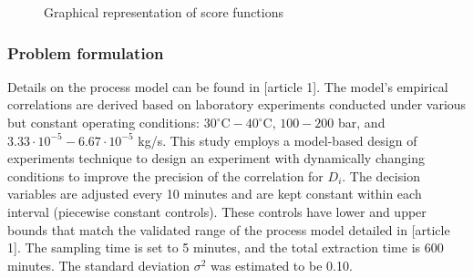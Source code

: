 \documentclass[../Article_Design_of_Experiment.tex]{subfiles}
\begin{document}
	\begin{figure}[!h]
		\centering
		\caption{Graphical representation of score functions}
		\label{fig:score_fun}
	\end{figure}
	
	\subsubsection{Problem formulation}
	
	Details on the process model can be found in [article 1]. The model's empirical correlations are derived based on laboratory experiments conducted under various but constant operating conditions: $30^\circ\text{C} - 40^\circ\text{C}$, $100 - 200$ bar, and $3.33 \cdot 10^{-5} - 6.67 \cdot 10^{-5}$ kg/s. This study employs a model-based design of experiments technique to design an experiment with dynamically changing conditions to improve the precision of the correlation for $D_i$. The decision variables are adjusted every 10 minutes and are kept constant within each interval (piecewise constant controls). These controls have lower and upper bounds that match the validated range of the process model detailed in [article 1]. The sampling time is set to 5 minutes, and the total extraction time is 600 minutes. The standard deviation $\sigma^2$ was estimated to be 0.10.
	
\end{document}
